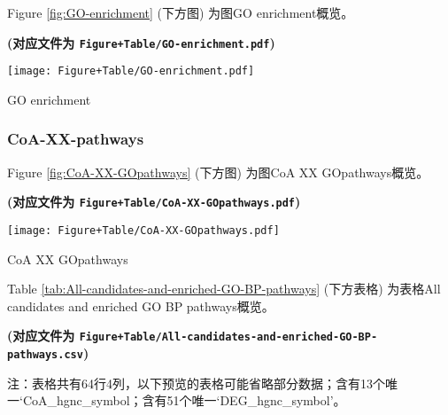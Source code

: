 \documentclass[
]{article}
\begin{document}
Figure \ref{fig:GO-enrichment} (下方图) 为图GO enrichment概览。

\textbf{(对应文件为 \texttt{Figure+Table/GO-enrichment.pdf})}

\def\@captype{figure}
\begin{center}
\texttt{[image: Figure+Table/GO-enrichment.pdf]}
\caption{GO enrichment}\label{fig:GO-enrichment}
\end{center}

\hypertarget{coa-xx-pathways}{%
\subsubsection{CoA-XX-pathways}\label{coa-xx-pathways}}

Figure \ref{fig:CoA-XX-GOpathways} (下方图) 为图CoA XX GOpathways概览。

\textbf{(对应文件为 \texttt{Figure+Table/CoA-XX-GOpathways.pdf})}

\def\@captype{figure}
\begin{center}
\texttt{[image: Figure+Table/CoA-XX-GOpathways.pdf]}
\caption{CoA XX GOpathways}\label{fig:CoA-XX-GOpathways}
\end{center}

Table \ref{tab:All-candidates-and-enriched-GO-BP-pathways} (下方表格) 为表格All candidates and enriched GO BP pathways概览。

\textbf{(对应文件为 \texttt{Figure+Table/All-candidates-and-enriched-GO-BP-pathways.csv})}

\begin{center}\begin{tcolorbox}[colback=gray!10, colframe=gray!50, width=0.9\linewidth, arc=1mm, boxrule=0.5pt]注：表格共有64行4列，以下预览的表格可能省略部分数据；含有13个唯一`CoA\_hgnc\_symbol；含有51个唯一`DEG\_hgnc\_symbol'。
\end{tcolorbox}
\end{center}
\end{document}
